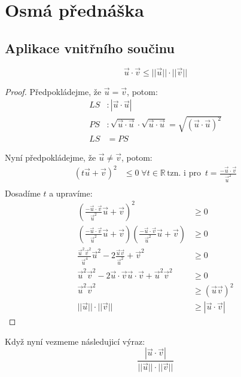 \section{Osmá přednáška}
\subsection{Aplikace vnitřního součinu}

\begin{theorem}
    $$\vec{u} \cdot \vec{v} \leq ||\vec{u}|| \cdot ||\vec{v}||$$
\end{theorem}
\begin{proof}
    Předpokládejme, že $\vec{u} = \vec{v}$, potom:
    \begin{align*}
        LS&: |\vec{u} \cdot \vec{u}|\\
        PS&: \sqrt{\vec{u} \cdot \vec{u}} \cdot \sqrt{\vec{u} \cdot \vec{u}}
            = \sqrt{(\vec{u} \cdot \vec{u})^2}\\
        LS &= PS
    \end{align*}

    Nyní předpokládejme, že $\vec{u} \neq \vec{v}$, potom:
    \begin{align*}
        (t \vec{u} + \vec{v})^2 &\leq 0\; \forall t \in \mathbb{R}\, \text{tzn. i pro }\,
            t= \frac{-\vec{u} \cdot \vec{v}}{\vec{u}^2}\\
    \end{align*}
    Dosadíme $t$ a upravíme:
    \begin{align*}
        (\frac{-\vec{u} \cdot \vec{v}}{\vec{u}^2} \vec{u} + \vec{v})^2 &\geq 0\\
        (\frac{-\vec{u} \cdot \vec{v}}{\vec{u}^2} \vec{u} + \vec{v})
            (\frac{-\vec{u} \cdot \vec{v}}{\vec{u}^2} \vec{u} + \vec{v}) &\geq 0\\
        \frac{\vec{u}^2 \vec{v}^2}{\vec{u}^4} \vec{u}^2 - 2\frac{\vec{u}\vec{v}}{\vec{u}^2} +
            \vec{v}^2 &\geq 0\\
        \vec{u}^2\vec{v}^2 - 2\vec{u}\cdot \vec{v}\vec{u} \cdot \vec{v} + \vec{u}^2\vec{v}^2 &\geq 0\\
        \vec{u}^2\vec{v}^2 &\geq (\vec{u} \vec{v})^2\\
        ||\vec{u}|| \cdot ||\vec{v}|| &\geq |\vec{u} \cdot \vec{v}|
    \end{align*}
\end{proof}

Když nyní vezmeme následujicí výraz:
$$\frac{|\vec{u} \cdot \vec{v}|}
{||\vec{u}|| \cdot||\vec{v}||}$$

